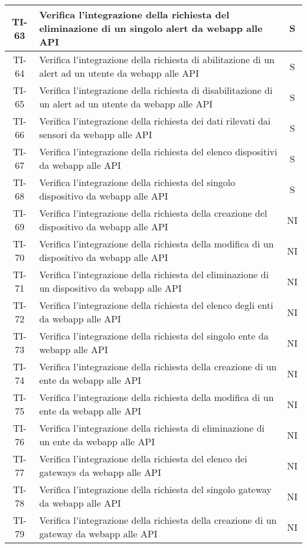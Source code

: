 \begin{center}
\begin{longtable}{|c|p{12cm}|c|}
			\hline
			TI-63 & Verifica l'integrazione della richiesta del eliminazione di un singolo alert da webapp alle API & S \\
			\hline
			TI-64 & Verifica l'integrazione della richiesta di abilitazione di un alert ad un utente da webapp alle API & S \\
			\hline
			TI-65 & Verifica l'integrazione della richiesta di disabilitazione di un alert ad un utente da webapp alle API & S \\
			\hline
			TI-66 & Verifica l'integrazione della richiesta dei dati rilevati dai sensori da webapp alle API & S \\
			\hline
			TI-67 & Verifica l'integrazione della richiesta del elenco dispositivi da webapp alle API & S \\
			\hline
			TI-68 & Verifica l'integrazione della richiesta del singolo dispositivo da webapp alle API & S \\
			\hline
			TI-69 & Verifica l'integrazione della richiesta della creazione del dispositivo da webapp alle API & NI \\
			\hline
			TI-70 & Verifica l'integrazione della richiesta della modifica di un dispositivo da webapp alle API & NI \\
			\hline
			TI-71 & Verifica l'integrazione della richiesta del eliminazione di un dispositivo da webapp alle API & NI \\
			\hline
			TI-72 & Verifica l'integrazione della richiesta del elenco degli enti da webapp alle API & NI \\
			\hline
			TI-73 & Verifica l'integrazione della richiesta del singolo ente da webapp alle API & NI \\
			\hline
			TI-74 & Verifica l'integrazione della richiesta della creazione di un ente da webapp alle API & NI \\
			\hline
			TI-75 & Verifica l'integrazione della richiesta della modifica di un ente da webapp alle API & NI \\
			\hline
			TI-76 & Verifica l'integrazione della richiesta di eliminazione di un ente da webapp alle API & NI \\
			\hline
			TI-77 & Verifica l'integrazione della richiesta del elenco dei gateways da webapp alle API & NI \\
			\hline
			TI-78 & Verifica l'integrazione della richiesta del singolo gateway da webapp alle API & NI \\
			\hline
			TI-79 & Verifica l'integrazione della richiesta della creazione di un gateway da webapp alle API & NI \\

\end{longtable}
\end{center}
